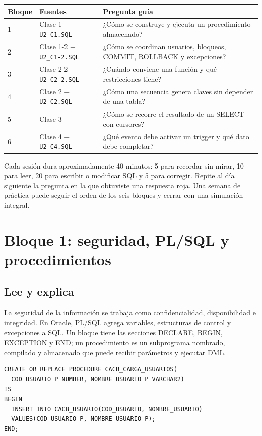 \documentclass[11pt,a4paper]{article}
\newcommand{\MinutosSesion}{40}
\newcommand{\campo}[1]{\texttt{#1}}
\begin{document}
\begin{longtable}{p{} p{} p{}}
\toprule\textbf{Bloque} & \textbf{Fuentes} & \textbf{Pregunta guía}\\\midrule\endhead
1 & Clase 1 + \campo{U2\_C1.SQL} & ¿Cómo se construye y ejecuta un procedimiento almacenado?\\
2 & Clase 1-2 + \campo{U2\_C1-2.SQL} & ¿Cómo se coordinan usuarios, bloqueos, COMMIT, ROLLBACK y excepciones?\\
3 & Clase 2-2 + \campo{U2\_C2-2.SQL} & ¿Cuándo conviene una función y qué restricciones tiene?\\
4 & Clase 2 + \campo{U2\_C2.SQL} & ¿Cómo una secuencia genera claves sin depender de una tabla?\\
5 & Clase 3 & ¿Cómo se recorre el resultado de un SELECT con cursores?\\
6 & Clase 4 + \campo{U2\_C4.SQL} & ¿Qué evento debe activar un trigger y qué dato debe completar?\\
\bottomrule
\end{longtable}

\begin{rutina}
Cada sesión dura aproximadamente \MinutosSesion{} minutos: 5 para recordar sin mirar, 10 para leer,
20 para escribir o modificar SQL y 5 para corregir. Repite al día siguiente la pregunta en la que
obtuviste una respuesta roja. Una semana de práctica puede seguir el orden de los seis bloques y
cerrar con una simulación integral.
\end{rutina}

\section{Bloque 1: seguridad, PL/SQL y procedimientos}
\subsection{Lee y explica}
La seguridad de la información se trabaja como confidencialidad, disponibilidad e integridad. En
Oracle, PL/SQL agrega variables, estructuras de control y excepciones a SQL. Un bloque tiene las
secciones DECLARE, BEGIN, EXCEPTION y END; un procedimiento es un subprograma nombrado, compilado y
almacenado que puede recibir parámetros y ejecutar DML.

\begin{lstlisting}
CREATE OR REPLACE PROCEDURE CACB_CARGA_USUARIOS(
  COD_USUARIO_P NUMBER, NOMBRE_USUARIO_P VARCHAR2)
IS
BEGIN
  INSERT INTO CACB_USUARIO(COD_USUARIO, NOMBRE_USUARIO)
  VALUES(COD_USUARIO_P, NOMBRE_USUARIO_P);
END;
\end{lstlisting}
\end{document}
